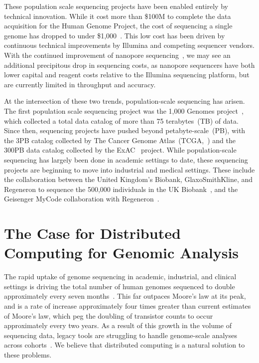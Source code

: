 \documentclass[phd]{ucbthesis}
\begin{document}
These population scale sequencing projects have been enabled entirely by
technical innovation. While it cost more than \$100M to complete the data
acquisition for the Human Genome Project, the cost of sequencing a single
genome has dropped to under \$1,000~\cite{nhgri}. This low cost has been driven by
continuous technical improvements by Illumina and competing sequencer vendors.
With the continued improvement of nanopore sequencing~\cite{jain17}, we may see
an additional precipitous drop in sequencing costs, as nanopore sequencers have
both lower capital and reagent costs relative to the Illumina sequencing
platform, but are currently limited in throughput and accuracy.

At the intersection of these two trends, population-scale sequencing has arisen.
The first population scale sequencing project was the 1,000 Genomes
project~\cite{1kg}, which collected a total data catalog of more than 75
terabytes~(TB) of data. Since then, sequencing projects have pushed beyond
petabyte-scale~(PB), with the 3PB catalog collected by The Cancer Genome
Atlas~(TCGA,~\cite{weinstein13}) and the 300PB data catalog collected by the
ExAC~\cite{lek16} project. While population-scale sequencing has largely been
done in academic settings to date, these sequencing projects are beginning
to move into industrial and medical settings. These include the collaboration
between the United Kingdom's Biobank, GlaxoSmithKline, and Regeneron to sequence
the 500,000 individuals in the UK Biobank~\cite{ukbiobank}, and the Geisenger
MyCode collaboration with Regeneron~\cite{carey16}.

\section{The Case for Distributed Computing for Genomic Analysis}
\label{sec:distributed-computing-for-genomics}

The rapid uptake of genome sequencing in academic, industrial, and clinical
settings is driving the total number of human genomes sequenced to double
approximately every seven months~\cite{stephens15}. This far outpaces
Moore's law at its peak, and is a rate of increase approximately four times
greater than current estimates of Moore's law, which peg the doubling of
transistor counts to occur approximately every two years. As a result of
this growth in the volume of sequencing data, legacy tools are struggling to
handle genome-scale analyses across cohorts~\cite{linderman17, schadt10}.
We believe that distributed computing is a natural solution to these problems.
\end{document}
